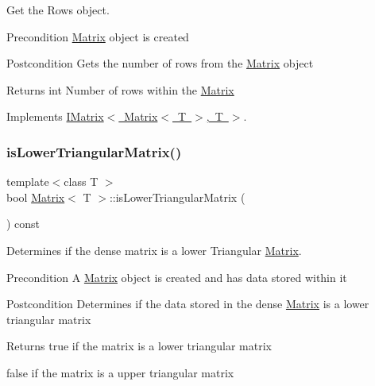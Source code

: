 Get the Rows object. 

\begin{DoxyPrecond}{Precondition}
\mbox{\hyperlink{class_matrix}{Matrix}} object is created 
\end{DoxyPrecond}
\begin{DoxyPostcond}{Postcondition}
Gets the number of rows from the \mbox{\hyperlink{class_matrix}{Matrix}} object 
\end{DoxyPostcond}
\begin{DoxyReturn}{Returns}
int Number of rows within the \mbox{\hyperlink{class_matrix}{Matrix}} 
\end{DoxyReturn}


Implements \mbox{\hyperlink{class_i_matrix_a58632b018f4023768db7963e22f468da}{I\+Matrix$<$ Matrix$<$ T $>$, T $>$}}.

\mbox{\label{class_matrix_a6e1df160cc8cb63f5b0bb58398b6e7ca}} 
\subsubsection{\texorpdfstring{isLowerTriangularMatrix()}{isLowerTriangularMatrix()}}
{\footnotesize\ttfamily template$<$class T $>$ \\
bool \mbox{\hyperlink{class_matrix}{Matrix}}$<$ T $>$\+::is\+Lower\+Triangular\+Matrix (\begin{DoxyParamCaption}{ }\end{DoxyParamCaption}) const}



Determines if the dense matrix is a lower Triangular \mbox{\hyperlink{class_matrix}{Matrix}}. 

\begin{DoxyPrecond}{Precondition}
A \mbox{\hyperlink{class_matrix}{Matrix}} object is created and has data stored within it 
\end{DoxyPrecond}
\begin{DoxyPostcond}{Postcondition}
Determines if the data stored in the dense \mbox{\hyperlink{class_matrix}{Matrix}} is a lower triangular matrix
\end{DoxyPostcond}
\begin{DoxyReturn}{Returns}
true if the matrix is a lower triangular matrix 

false if the matrix is a upper triangular matrix 
\end{DoxyReturn}
\mbox{\label{class_matrix_a3d177e2d4c6d8ccf7a1c4c651f4bc075}} 
